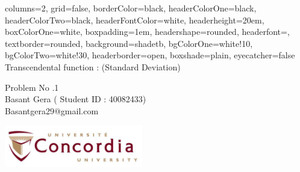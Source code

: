 \documentclass[a0paper,portrait]{baposter}
\begin{document}

\begin{poster}{
  columns=2,
	grid=false,
	borderColor=black,
	headerColorOne=black,
	headerColorTwo=black,
	headerFontColor=white,
    headerheight=20em,
	boxColorOne=white,
    boxpadding=1em,
	headershape=rounded,
	headerfont=\Large\textsf,
	textborder=rounded,
	background=shadetb,
    bgColorOne=white!10,
    bgColorTwo=white!30,
	headerborder=open,
    boxshade=plain,
    eyecatcher=false
}
{
}
{\smaller Transcendental function :  \sigma \quad   (Standard Deviation) }
{
  \vspace{1em}
  	{\smaller 	Problem No .1}\\
  Basant Gera  ( Student ID : 40082433)\\
	{\smaller Basantgera29@gmail.com}

}
{\begin{minipage}{20.0em}
    \includegraphics[height=5em]{Concordia.jpg}
  \end{minipage}
}


\end{poster}
\end{document}
